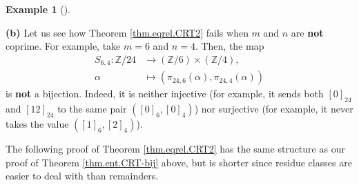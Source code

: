 \documentclass[numbers=enddot,12pt,final,onecolumn,notitlepage]{scrartcl}%
\numberwithin{exer}{subsection}
\theoremstyle{definition}
\newtheorem{exam}[theo]{Example}
\newenvironment{example}[1][]
{\begin{exam}[#1]\begin{leftbar}}
{\end{leftbar}\end{exam}}
\begin{document}
\begin{example}
\textbf{(b)} Let us see how Theorem \ref{thm.eqrel.CRT2} fails when $m$ and
$n$ are \textbf{not} coprime. For example, take $m=6$ and $n=4$. Then, the map%
\begin{align*}
S_{6,4}:\mathbb{Z}/24  &  \rightarrow\left(  \mathbb{Z}/6\right)
\times\left(  \mathbb{Z}/4\right)  ,\\
\alpha &  \mapsto\left(  \pi_{24,6}\left(  \alpha\right)  ,\pi_{24,4}\left(
\alpha\right)  \right)
\end{align*}
is \textbf{not} a bijection. Indeed, it is neither injective (for example, it
sends both $\left[  0\right]  _{24}$ and $\left[  12\right]  _{24}$ to the
same pair $\left(  \left[  0\right]  _{6},\left[  0\right]  _{4}\right)  $)
nor surjective (for example, it never takes the value $\left(  \left[
1\right]  _{6},\left[  2\right]  _{4}\right)  $).
\end{example}

The following proof of Theorem \ref{thm.eqrel.CRT2} has the same structure as
our proof of Theorem \ref{thm.ent.CRT-bij} above, but is shorter since residue
classes are easier to deal with than remainders.
\end{document}
